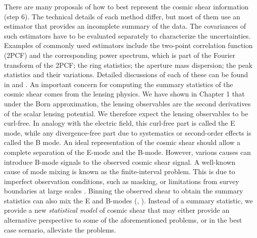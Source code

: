 There are many proposals of how to best represent the cosmic shear information
(step 6). The technical details of each method differ, but most of them use
an estimator that provides an incomplete summary of the data. The covariances of
such estimators have to be evaluated separately to characterize the
uncertainties.
Examples of commonly used estimators include the two-point correlation function 
(2PCF) and the corresponding power spectrum, which is part of the Fourier transform of the 2PCF; 
the ring statistics; the aperture mass dispersion; the peak statistics and
their variations. Detailed discussions of each of these can be found in 
\cite{Kilbinger2015} and \cite{Bartelmann2001a}.
An important concern for computing the summary statistics of the cosmic shear 
comes from the lensing physics. We have shown in Chapter 1 that  
under the Born approximation, the lensing observables are the second derivatives of the
scalar lensing potential. We therefore expect the lensing observables to be curl-free.
In analogy with the electric field, this curl-free part is called the E mode, 
while any divergence-free part due to systematics or second-order effects is called the 
B mode.
An ideal representation of the
cosmic shear should allow a complete separation of the E-mode and the B-mode.
However, various causes can
introduce B-mode signals to the observed cosmic shear signal. A well-known
cause of mode mixing is known as the finite-interval problem. This is due to
imperfect observation conditions, such as masking,
or limitations from survey boundaries at large scales \citep{Kilbinger2013}.  
Binning the observed shear to obtain the summary statistics can also mix the E and B-modes 
(\citealt{Eifler2010},
\citealt{Becker2013}). Instead of a summary statistic, we provide a new 
{\it statistical model} of cosmic shear that may either provide an alternative
perspective to some of the aforementioned problems, or in the best case
scenario, alleviate the problems. 
 
